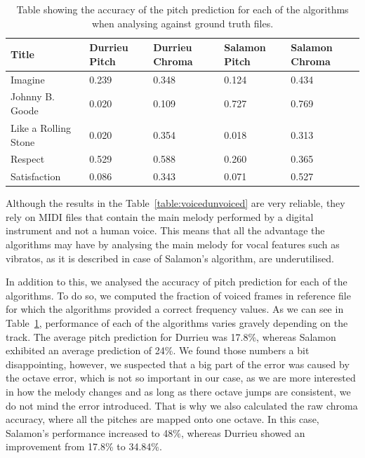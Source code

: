 \begin{table}
\begin{center}
\begin{tabular} {| p{5cm}| p{1.75cm} | p{1.75cm} | p{1.75cm} | p{1.75cm} |} \hline
Title 	& Durrieu Pitch & Durrieu Chroma & Salamon Pitch & Salamon Chroma \\ \hline \hline
Imagine						& 0.239		& 0.348		& 0.124			& 0.434		\\	\hline
Johnny B. Goode		& 0.020		& 0.109		& 0.727			& 0.769		\\ 	\hline
Like a Rolling Stone	& 0.020		& 0.354		& 0.018			& 0.313		\\ 	\hline
Respect						& 0.529		& 0.588		& 0.260			& 0.365		\\ 	\hline
Satisfaction				& 0.086		& 0.343		& 0.071			& 0.527		\\	\hline
\end{tabular}
\caption{Table showing the accuracy of the pitch prediction for each of the algorithms when analysing against ground truth files.}
\label{table:melodypitchchroma}
\end{center}
\end{table}


Although the results in the Table~\ref{table:voicedunvoiced} are very reliable, they rely on MIDI files that contain the main melody performed by a digital instrument and not a human voice. This means that all the advantage the algorithms may have by analysing the main melody for vocal features such as vibratos, as it is described in case of Salamon's algorithm, are underutilised. 

In addition to this, we analysed the accuracy of pitch prediction for each of the algorithms. 
To do so, we computed the fraction of voiced frames in reference file for which the algorithms provided a correct frequency values. As we can see in Table~\ref{table:melodypitchchroma}, performance of each of the algorithms varies gravely depending on the track. The average pitch prediction for Durrieu was  17.8\%, whereas Salamon exhibited an average prediction of 24\%. We found those numbers a bit disappointing, however, we suspected that a big part of the error was caused by the octave error, which is not so important in our case, as we are more interested in how the melody changes and as long as there octave jumps are consistent, we do not mind the error introduced. That is why we also calculated the raw chroma accuracy, where all the pitches are mapped onto one octave. In this case, Salamon's performance increased to 48\%, whereas Durrieu showed an improvement from 17.8\% to 34.84\%.

